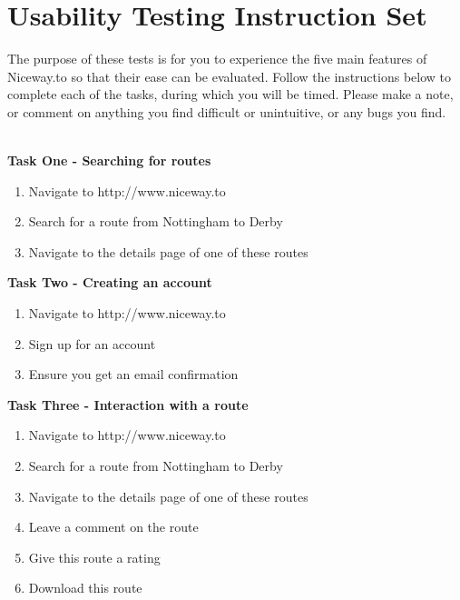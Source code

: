 \newpage
\restoregeometry
{}
\pagestyle{appendix}

\section{Usability Testing Instruction Set}
\label{sec:utis}
The purpose of these tests is for you to experience the five main features of Niceway.to so that their ease can be evaluated. Follow the instructions below to complete each of the tasks, during which you will be timed. Please make a note, or comment on anything you find difficult or unintuitive, or any bugs you find.
\ \\
\ \\
\begin{Large}\noindent\textbf{Task One - Searching for routes}\end{Large}
\begin{enumerate}
	\item Navigate to http://www.niceway.to
	\item Search for a route from Nottingham to Derby
	\item Navigate to the details page of one of these routes
\end{enumerate}

\begin{Large}\noindent\textbf{Task Two - Creating an account}\end{Large}
\begin{enumerate}
	\item Navigate to http://www.niceway.to
	\item Sign up for an account 
	\item Ensure you get an email confirmation
\end{enumerate}

\begin{Large}\noindent\textbf{Task Three - Interaction with a route}\end{Large}
\begin{enumerate}
	\item Navigate to http://www.niceway.to
	\item Search for a route from Nottingham to Derby
	\item Navigate to the details page of one of these routes
	\item Leave a comment on the route
	\item Give this route a rating
	\item Download this route
\end{enumerate}

